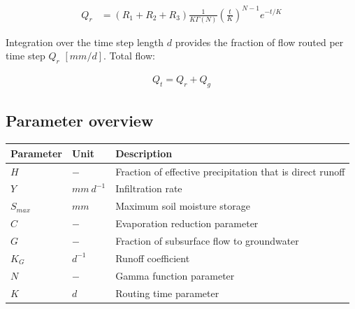 \begin{align}
 	Q_r &= \left(R_1+R_2+R_3\right)\frac{1}{K\Gamma(N)}\left(\frac{t}{K}\right)^{N-1}e^{-t/K}
\end{align}

Integration over the time step length $d$ provides the fraction of flow routed per time step $Q_r$ $[mm/d]$. Total flow:

\begin{align}
	Q_t = Q_r+Q_g
\end{align}

\newpage
\subsection{Parameter overview}
\begin{table}[htbp]
  \centering
    \begin{tabular}{lll}
    \toprule
    Parameter & Unit  & Description \\
    \midrule
    $H$   & $-$   & Fraction of effective precipitation that is direct runoff \\
    $Y$   & $mm~d^{-1}$ & Infiltration rate \\
    $S_{max}$ & $mm$  & Maximum soil moisture storage \\
    $C$   & $-$   & Evaporation reduction parameter \\
    $G$   & $-$   & Fraction of subsurface flow to groundwater \\
    $K_G$ & $d^{-1}$ & Runoff coefficient \\
    $N$   & $-$   & Gamma function parameter \\
    $K$   & $d$   & Routing time parameter \\
    \bottomrule
    \end{tabular}%
  \label{tab:addlabel}%
\end{table}%
